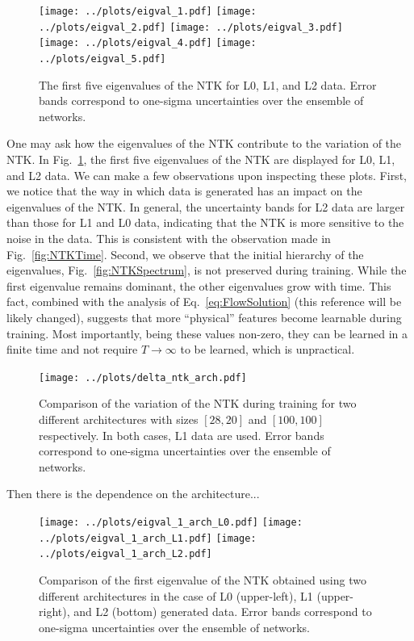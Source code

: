 \begin{figure}[h!]
  \centering
  \texttt{[image: ../plots/eigval\_1.pdf]}
  \texttt{[image: ../plots/eigval\_2.pdf]}
  \texttt{[image: ../plots/eigval\_3.pdf]}
  \texttt{[image: ../plots/eigval\_4.pdf]}
  \texttt{[image: ../plots/eigval\_5.pdf]}
  \vspace{0.5cm}
  \caption{The first five eigenvalues of the NTK for L0, L1, and L2 data. Error
  bands correspond to one-sigma uncertainties over the ensemble of networks.}
  \label{fig:EigvalsComparison}
\end{figure}
One may ask how the eigenvalues of the NTK contribute to the variation of the
NTK. In Fig.~\ref{fig:EigvalsComparison}, the first five eigenvalues of the NTK
are displayed for L0, L1, and L2 data. We can make a few observations upon
inspecting these plots. First, we notice that the way in which data is generated
has an impact on the eigenvalues of the NTK. In general, the uncertainty bands
for L2 data are larger than those for L1 and L0 data, indicating that the NTK is
more sensitive to the noise in the data. This is consistent with the observation
made in Fig.~\ref{fig:NTKTime}. Second, we observe that the initial hierarchy of
the eigenvalues, Fig.~\ref{fig:NTKSpectrum}, is not preserved during training.
While the first eigenvalue remains dominant, the other eigenvalues grow with
time. This fact, combined with the analysis of Eq.~\eqref{eq:FlowSolution}
\ac{(this reference will be likely changed)}, suggests that more ``physical''
features become learnable during training. Most importantly, being these values
non-zero, they can be learned in a finite time and not require
$T\rightarrow\infty$ to be learned, which is unpractical.

\begin{figure}[h!]
  \centering
  \texttt{[image: ../plots/delta\_ntk\_arch.pdf]}
  \caption{Comparison of the variation of the NTK during training for two
  different architectures with sizes $[28,20]$ and $[100,100]$ respectively. In
  both cases, L1 data are used. Error bands correspond to one-sigma
  uncertainties over the ensemble of networks.}
  \label{fig:NTKTimeDiffArch}
\end{figure}
Then there is the dependence on the architecture...

\begin{figure}[h!]
  \centering
  \texttt{[image: ../plots/eigval\_1\_arch\_L0.pdf]}
  \texttt{[image: ../plots/eigval\_1\_arch\_L1.pdf]}
  \texttt{[image: ../plots/eigval\_1\_arch\_L2.pdf]}
  \vspace{0.5cm}
  \caption{Comparison of the first eigenvalue of the NTK obtained using two
  different architectures in the case of L0 (upper-left), L1 (upper-right), and
  L2 (bottom) generated data. Error bands correspond to one-sigma uncertainties
  over the ensemble of networks.}
  \label{fig:NTKvalsDiffArch}
\end{figure}
